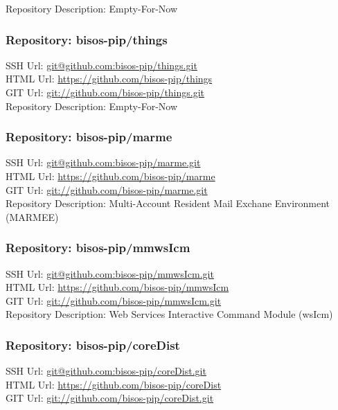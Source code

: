 Repository Description: Empty-For-Now

\subsubsection{Repository: bisos-pip/things}

SSH Url:  \url{git@github.com:bisos-pip/things.git}\\
HTML Url: \url{https://github.com/bisos-pip/things}\\
GIT Url:  \url{git://github.com/bisos-pip/things.git}\\


Repository Description: Empty-For-Now

\subsubsection{Repository: bisos-pip/marme}

SSH Url:  \url{git@github.com:bisos-pip/marme.git}\\
HTML Url: \url{https://github.com/bisos-pip/marme}\\
GIT Url:  \url{git://github.com/bisos-pip/marme.git}\\


Repository Description: Multi-Account Resident Mail Exchane Environment (MARMEE)

\subsubsection{Repository: bisos-pip/mmwsIcm}

SSH Url:  \url{git@github.com:bisos-pip/mmwsIcm.git}\\
HTML Url: \url{https://github.com/bisos-pip/mmwsIcm}\\
GIT Url:  \url{git://github.com/bisos-pip/mmwsIcm.git}\\


Repository Description: Web Services Interactive Command Module (wsIcm)

\subsubsection{Repository: bisos-pip/coreDist}

SSH Url:  \url{git@github.com:bisos-pip/coreDist.git}\\
HTML Url: \url{https://github.com/bisos-pip/coreDist}\\
GIT Url:  \url{git://github.com/bisos-pip/coreDist.git}\\



